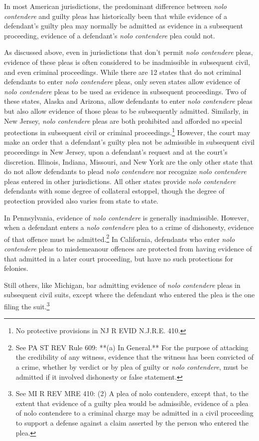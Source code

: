 In most American jurisdictions, the predominant difference between \textit{nolo contendere} and guilty pleas has historically been that while evidence of a defendant's guilty plea may normally be admitted as evidence in a subsequent proceeding, evidence of a defendant's \textit{nolo contendere} plea could not. 

As discussed above, even in jurisdictions that don't permit \textit{nolo contendere} pleas, evidence of these pleas is often considered to be inadmissible in subsequent civil, and even criminal proceedings. While there are 12 states that do not criminal defendants to enter \textit{nolo contendere} pleas, only seven states allow evidence of \textit{nolo contendere} pleas to be used as evidence in subsequent proceedings. Two of these states, Alaska and Arizona, allow defendants to enter \textit{nolo contendere} pleas but also allow evidence of those pleas to be subsequently admitted. Similarly, in New Jersey, \textit{nolo contendere} pleas are both prohibited and afforded no special protections in subsequent civil or criminal proceedings.\footnote{No protective provisions in NJ R EVID N.J.R.E. 410.} However, the court may make an order that a defendant's guilty plea not be admissible in subsequent civil proceedings in New Jersey, upon a defendant's request and at the court's discretion. Illinois, Indiana, Missouri, and New York are the only other state that do not allow defendants to plead \textit{nolo contendere} nor recognize \textit{nolo contendere} pleas entered in other jurisdictions. All other states provide \textit{nolo contendere} defendants with some degree of collateral estoppel, though the degree of protection provided also varies from state to state.

In Pennsylvania, evidence of \textit{nolo contendere} is generally inadmissible. However, when a defendant enters a \textit{nolo contendere} plea to a crime of dishonesty, evidence of that offence must be admitted.\footnote{See PA ST REV Rule 609: **(a) In General.** For the purpose of attacking the credibility of any witness, evidence that the witness has been convicted of a crime, whether by verdict or by plea of guilty or \textit{nolo contendere}, must be admitted if it involved dishonesty or false statement.} In California, defendants who enter \textit{nolo contendere} pleas to misdemeanour offences are protected from having evidence of that admitted in a later court proceeding, but have no such protections for felonies.

Still others, like Michigan, bar admitting evidence of \textit{nolo contendere} pleas in subsequent civil suits, except where the defendant who entered the plea is the one filing the suit.\footnote{See MI R REV MRE 410: (2) A plea of nolo contendere, except that, to the extent that evidence of a guilty plea would be admissible, evidence of a plea of nolo contendere to a criminal charge may be admitted in a civil proceeding to support a defense against a claim asserted by the person who entered the plea.} 

